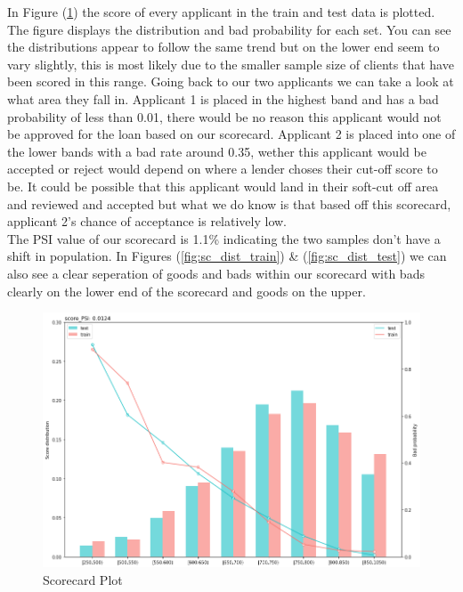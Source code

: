 In Figure (\ref{scorecard_plot}) the score of every applicant in the train and test data is plotted. The figure displays the distribution and bad probability for each set. You can see the distributions appear to follow the same trend but on the lower end seem to vary slightly, this is most likely due to the smaller sample size of clients that have been scored in this range. Going back to our two applicants we can take a look at what area they fall in. Applicant 1 is placed in the highest band and has a bad probability of less than 0.01, there would be no reason this applicant would not be approved for the loan based on our scorecard. Applicant 2 is placed into one of the lower bands with a bad rate around 0.35, wether this applicant would be accepted or reject would depend on where a lender choses their cut-off score to be. It could be possible that this applicant would land in their soft-cut off area and reviewed and accepted but what we do know is that based off this scorecard, applicant 2's chance of acceptance is relatively low. \\

The PSI value of our scorecard is 1.1\% indicating the two samples don't have a shift in population. In Figures (\ref{fig:sc_dist_train}) \& (\ref{fig:sc_dist_test}) we can also see a clear seperation of goods and bads within our scorecard with bads clearly on the lower end of the scorecard and goods on the upper. 

%

\begin{landscape}
\begin{figure}[!ht]
\begin{center}
	\includegraphics[scale=0.70]{figs/scorecard_plot.png}
	\caption{Scorecard Plot \label{scorecard_plot}}
\end{center}
\end{figure}
\end{landscape} 

